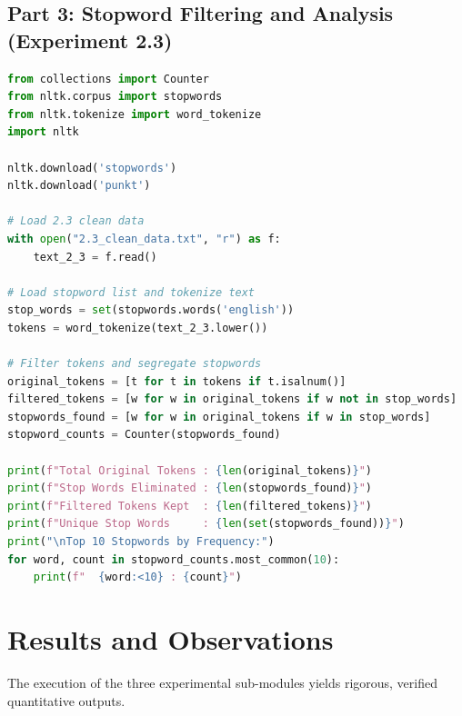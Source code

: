 \documentclass[12pt,a4paper]{report}
\begin{document}
\subsection{Part 3: Stopword Filtering and Analysis (Experiment 2.3)}
\begin{lstlisting}[language=Python, caption={Experiment 2.3: Tokenization and Stopword Removal}]
from collections import Counter
from nltk.corpus import stopwords
from nltk.tokenize import word_tokenize
import nltk

nltk.download('stopwords')
nltk.download('punkt')

# Load 2.3 clean data
with open("2.3_clean_data.txt", "r") as f:
    text_2_3 = f.read()

# Load stopword list and tokenize text
stop_words = set(stopwords.words('english'))
tokens = word_tokenize(text_2_3.lower())

# Filter tokens and segregate stopwords
original_tokens = [t for t in tokens if t.isalnum()]
filtered_tokens = [w for w in original_tokens if w not in stop_words]
stopwords_found = [w for w in original_tokens if w in stop_words]
stopword_counts = Counter(stopwords_found)

print(f"Total Original Tokens : {len(original_tokens)}")
print(f"Stop Words Eliminated : {len(stopwords_found)}")
print(f"Filtered Tokens Kept  : {len(filtered_tokens)}")
print(f"Unique Stop Words     : {len(set(stopwords_found))}")
print("\nTop 10 Stopwords by Frequency:")
for word, count in stopword_counts.most_common(10):
    print(f"  {word:<10} : {count}")
\end{lstlisting}

\section{Results and Observations}
The execution of the three experimental sub-modules yields rigorous, verified quantitative outputs.
\end{document}
